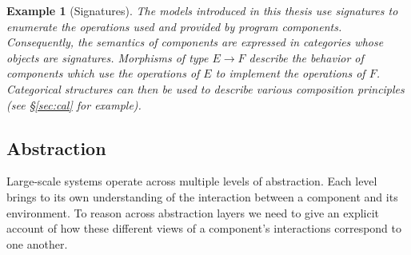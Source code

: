 \documentclass[draft,11pt]{report}
\newtheorem{example}[theorem]{Example}
\theoremstyle{definition}
\newcommand{\kw}[1]{\ensuremath{ \mathsf{#1} }}
\begin{document}

\begin{example}[Signatures]
The models introduced in this thesis use \emph{signatures}
to enumerate the operations used and provided by program components.
Consequently,
the semantics of components are expressed in categories
whose objects are signatures.
Morphisms of type $E \rightarrow F$
describe the behavior of components 
which use the operations of $E$
to implement the operations of $F$.
Categorical structures can then be used to
describe various composition principles
(see \S\ref{sec:cal} for example).
\end{example}


\subsection{Abstraction} %

Large-scale systems operate across multiple levels of abstraction.
Each level brings to its own understanding of the interaction
between a component and its environment.
To reason across abstraction layers we need to give
an explicit account of how these different views
of a component's interactions
correspond to one another.
\end{document}
